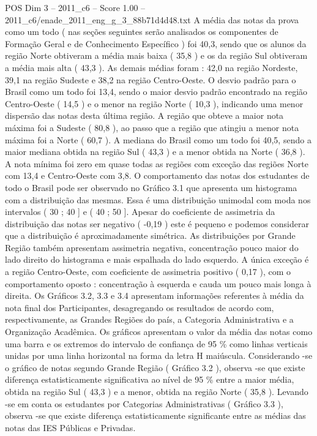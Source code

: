 \begin{textsample}{POS Dim 3 – 2011\_c6 – Score 1.00 – 2011\_c6/enade\_2011\_eng\_g\_3\_88b71d4d48.txt}
A média das notas da prova como um todo ( nas seções seguintes serão analisados os componentes de Formação Geral e de Conhecimento Específico ) foi 40,3, sendo que os alunos da região Norte obtiveram a média mais baixa ( 35,8 ) e os da região Sul obtiveram a média mais alta ( 43,3 ).
As demais médias foram : 42,0 na região Nordeste, 39,1 na região Sudeste e 38,2 na região Centro-Oeste.
O desvio padrão para o Brasil como um todo foi 13,4, sendo o maior desvio padrão encontrado na região Centro-Oeste ( 14,5 ) e o menor na região Norte ( 10,3 ), indicando uma menor dispersão das notas desta última região.
A região que obteve a maior nota máxima foi a Sudeste ( 80,8 ), ao passo que a região que atingiu a menor nota máxima foi a Norte ( 60,7 ).
A mediana do Brasil como um todo foi 40,5, sendo a maior mediana obtida na região Sul ( 43,3 ) e a menor obtida na Norte ( 36,8 ).
A nota mínima foi zero em quase todas as regiões com exceção das regiões Norte com 13,4 e Centro-Oeste com 3,8.
O comportamento das notas dos estudantes de todo o Brasil pode ser observado no Gráfico 3.1 que apresenta um histograma com a distribuição das mesmas.
Essa é uma distribuição unimodal com moda nos intervalos ( 30 ; 40 ] e ( 40 ; 50 ].
Apesar do coeficiente de assimetria da distribuição das notas ser negativo ( -0,19 ) este é pequeno e podemos considerar que a distribuição é aproximadamente simétrica.
As distribuições por Grande Região também apresentam assimetria negativa, concentração pouco maior do lado direito do histograma e mais espalhada do lado esquerdo.
A única exceção é a região Centro-Oeste, com coeficiente de assimetria positivo ( 0,17 ), com o comportamento oposto : concentração à esquerda e cauda um pouco mais longa à direita.
Os Gráficos 3.2, 3.3 e 3.4 apresentam informações referentes à média da nota final dos Participantes, desagregando os resultados de acordo com, respectivamente, as Grandes Regiões do país, a Categoria Administrativa e a Organização Acadêmica.
Os gráficos apresentam o valor da média das notas como uma barra e os extremos do intervalo de confiança de 95 \% como linhas verticais unidas por uma linha horizontal na forma da letra H maiúscula.
Considerando -se o gráfico de notas segundo Grande Região ( Gráfico 3.2 ), observa -se que existe diferença estatisticamente significativa ao nível de 95 \% entre a maior média, obtida na região Sul ( 43,3 ) e a menor, obtida na região Norte ( 35,8 ).
Levando -se em conta os estudantes por Categorias Administrativas ( Gráfico 3.3 ), observa -se que existe diferença estatisticamente significante entre as médias das notas das IES Públicas e Privadas.

\end{textsample}
